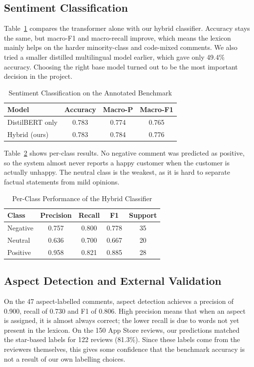 \documentclass[conference]{IEEEtran}
\begin{document}
\subsection{Sentiment Classification}
Table~\ref{tab:results} compares the transformer alone with our hybrid classifier. Accuracy stays the
same, but macro-F1 and macro-recall improve, which means the lexicon mainly helps on the harder
minority-class and code-mixed comments. We also tried a smaller distilled multilingual model
earlier, which gave only 49.4\% accuracy. Choosing the right base model turned out to be the most
important decision in the project.

\begin{table}[t]
\caption{Sentiment Classification on the Annotated Benchmark}
\label{tab:results}
\centering
\footnotesize
\begin{tabular}{l c c c}
\toprule
\textbf{Model} & \textbf{Accuracy} & \textbf{Macro-P} & \textbf{Macro-F1} \\
\midrule
DistilBERT only & 0.783 & 0.774 & 0.765 \\
Hybrid (ours) & 0.783 & 0.784 & 0.776 \\
\bottomrule
\end{tabular}
\end{table}

Table~\ref{tab:perclass} shows per-class results. No negative comment was predicted as positive, so
the system almost never reports a happy customer when the customer is actually unhappy. The neutral
class is the weakest, as it is hard to separate factual statements from mild opinions.

\begin{table}[t]
\caption{Per-Class Performance of the Hybrid Classifier}
\label{tab:perclass}
\centering
\footnotesize
\begin{tabular}{l c c c c}
\toprule
\textbf{Class} & \textbf{Precision} & \textbf{Recall} & \textbf{F1} & \textbf{Support} \\
\midrule
Negative & 0.757 & 0.800 & 0.778 & 35 \\
Neutral & 0.636 & 0.700 & 0.667 & 20 \\
Positive & 0.958 & 0.821 & 0.885 & 28 \\
\bottomrule
\end{tabular}
\end{table}

\subsection{Aspect Detection and External Validation}
On the 47 aspect-labelled comments, aspect detection achieves a precision of 0.900, recall of 0.730
and F1 of 0.806. High precision means that when an aspect is assigned, it is almost always correct;
the lower recall is due to words not yet present in the lexicon. On the 150 App Store reviews, our
predictions matched the star-based labels for 122 reviews (81.3\%). Since these labels come from the
reviewers themselves, this gives some confidence that the benchmark accuracy is not a result of our
own labelling choices.
\end{document}
